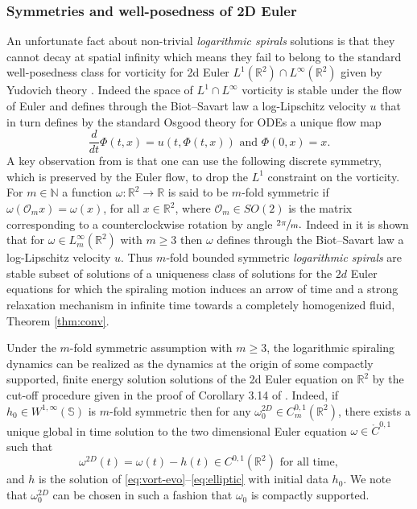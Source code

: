 \documentclass[JEP,XML,SOM,Unicode,NoFloatCountersInSection,published]{cedram}
\theoremstyle{plain}
\theoremstyle{definition}
\begin{document}
\subsubsection*{Symmetries and well-posedness of 2D Euler}
An unfortunate fact about non-trivial \textit{logarithmic spirals} solutions is that they cannot decay at spatial infinity which means they fail to belong to the standard well-posedness class for vorticity for 2d Euler $L^1(\mathbb{R}^2)\cap L^\infty(\mathbb{R}^2)$ given by Yudovich theory \cite{Y1}. Indeed the space of $L^1\cap L^\infty$ vorticity is stable under the flow of Euler and defines through the Biot--Savart law a log-Lipschitz velocity $u$ that in turn defines by the standard Osgood theory for ODEs a unique flow map
\[
\frac{d}{dt}\Phi(t,x)=u\left(t,\Phi(t,x)\right) \text{ and } \Phi(0,x)=x.
\]
A key observation from \cite{EJ1} is that one can use the following discrete symmetry, which is preserved by the Euler flow, to drop the $L^1$ constraint on the vorticity. For $m\in\mathbb{N}$ a function
$\omega:\mathbb{R}^2\to\mathbb{R}$ is said to be $m$-fold symmetric if $\omega(\mathcal{O}_{m}x)=\omega(x)$, for all $x\in\mathbb{R}^2$, where $\mathcal{O}_m\in SO(2)$ is the matrix corresponding to a counterclockwise rotation by angle $\sfrac{2\pi}{m}.$ Indeed in \cite{EJ1} it is shown that for $\omega \in L^\infty_m(\mathbb{R}^2)$ with $m\geq 3$ then $\omega$ defines through the Biot--Savart law a log-Lipschitz velocity $u$. Thus $m$-fold bounded symmetric \textit{logarithmic spirals} are stable subset of solutions of a uniqueness class of solutions for the $2d$ Euler equations for which the spiraling motion induces an arrow of time and a strong relaxation mechanism in infinite time towards a completely homogenized fluid, Theorem \ref{thm:conv}.

Under the $m$-fold symmetric assumption with $m\ge 3$, the logarithmic spiraling dynamics can be realized as the dynamics at the origin of some compactly supported, finite energy solution solutions of the 2d Euler equation on $\mathbb{R}^2$ by the cut-off procedure given in the proof of Corollary 3.14 of \cite{EJ1}. Indeed, if $h_0\in W^{1,\infty}(\mathbb{S})$ is $m$-fold symmetric then for any $\omega^{2D}_0\in C^{0,1}_m\left(\mathbb{R}^2\right)$, there exists a unique global in time solution to the two dimensional Euler equation $\omega\in \mathring{C}^{0,1}$ such that
\[
\omega^{2D}(t)=\omega(t)-h(t)\in C^{0,1}\left(\mathbb{R}^2\right) \text{ for all time},
\]
and $h$ is the solution of \eqref{eq:vort-evo}--\eqref{eq:elliptic} with initial data $h_0$. We note that $\omega^{2D}_0$ can be chosen in such a fashion that $\omega_0$ is compactly supported.
\end{document}
